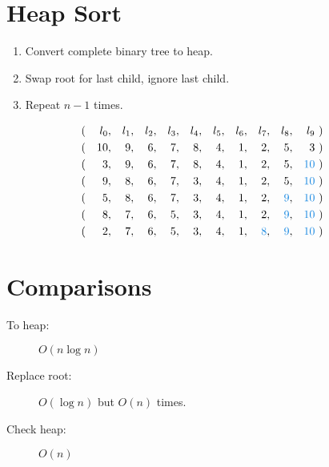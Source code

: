 \documentclass{notes}
\begin{document}
  \section*{Heap Sort}
    \begin{enumerate}
      \item Convert complete binary tree to heap.
      \item Swap root for last child, ignore last child.
      \item Repeat \(n-1\) times.
    \end{enumerate}

    \begin{align*}
      &(&l_0&,&l_1&,&l_2&,&l_3&,&l_4&,&l_5&,&l_6&,&l_7&,&l_8&,&l_9\ &)&\\
      &(&10&,&9&,&6&,&7&,&8&,&4&,&1&,&2&,&5&,&3\ &)&\\
      &(&3&,&9&,&6&,&7&,&8&,&4&,&1&,&2&,&5&,&{\color{gmitblue}10}\ &)&\\
      &(&9&,&8&,&6&,&7&,&3&,&4&,&1&,&2&,&5&,&{\color{gmitblue}10}\ &)&\\
      &(&5&,&8&,&6&,&7&,&3&,&4&,&1&,&2&,&{\color{gmitblue}9}&,&{\color{gmitblue}10}\ &)&\\
      &(&8&,&7&,&6&,&5&,&3&,&4&,&1&,&2&,&{\color{gmitblue}9}&,&{\color{gmitblue}10}\ &)&\\
      &(&2&,&7&,&6&,&5&,&3&,&4&,&1&,&{\color{gmitblue}8}&,&{\color{gmitblue}9}&,&{\color{gmitblue}10}\ &)&\\
    \end{align*}

  \section*{Comparisons}

    \begin{description}
      \item[To heap:] \(O(n \log n)\)
      \item[Replace root:] \(O(\log n)\) but \( O(n) \) times.
      \item[Check heap:] \(O(n)\) 
    \end{description}

\end{document}
